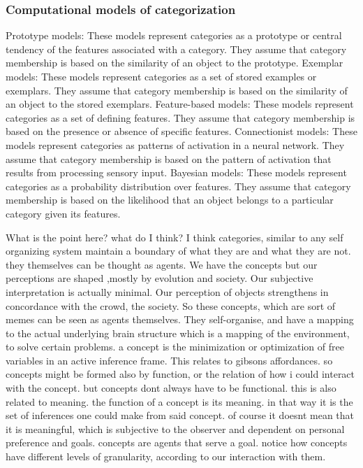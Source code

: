 \subsubsection{Computational models of categorization}
Prototype models: These models represent categories as a prototype or central tendency of the features associated with a category. They assume that category membership is based on the similarity of an object to the prototype.
Exemplar models: These models represent categories as a set of stored examples or exemplars. They assume that category membership is based on the similarity of an object to the stored exemplars.
Feature-based models: These models represent categories as a set of defining features. They assume that category membership is based on the presence or absence of specific features.
Connectionist models: These models represent categories as patterns of activation in a neural network. They assume that category membership is based on the pattern of activation that results from processing sensory input.
Bayesian models: These models represent categories as a probability distribution over features. They assume that category membership is based on the likelihood that an object belongs to a particular category given its features.

What is the point here? what do I think? I think categories, similar to any self organizing system maintain a boundary of what they are and what they are not. they themselves can be thought as agents. We have the concepts but our perceptions are shaped ,mostly by evolution and society. Our subjective interpretation is actually minimal. Our perception of objects strengthens in concordance with the crowd, the society. So these concepts, which are sort of memes can be seen as agents themselves. They self-organise, and have a mapping to the actual underlying brain structure which is a mapping of the environment, to solve certain problems. a concept is the minimization or optimization of free variables in an active inference frame. This relates to gibsons affordances. so concepts might be formed also by function, or the relation of how i could interact with the concept. but concepts dont always have to be functional. this is also related to meaning. the function of a concept is its meaning. in that way it is the set of inferences one could make from said concept. of course it doesnt mean that it is meaningful, which is subjective to the observer and dependent on personal preference and goals. concepts are agents that serve a goal. notice how concepts have different levels of granularity, according to our interaction with them. 



